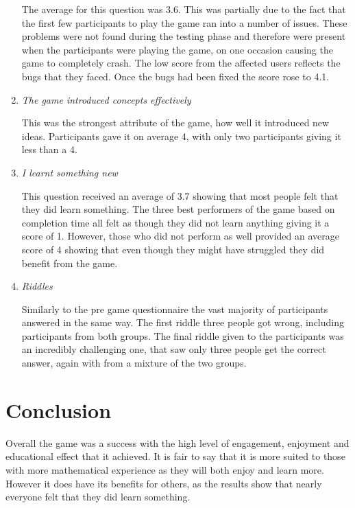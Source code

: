 \documentclass[12pt,a4paper]{report}
\begin{document}
\begin{enumerate}
	The average for this question was 3.6. This was partially due to the fact that the first few participants to play the game ran into a number of issues. These problems were not found during the testing phase and therefore were present when the participants were playing the game, on one occasion causing the game to completely crash. The low score from the affected users reflects the bugs that they faced. Once the bugs had been fixed the score rose to 4.1.
	
	\item  \textit {The game introduced concepts effectively}
	
	This was the strongest attribute of the game, how well it introduced new ideas. Participants gave it on average 4, with only two participants giving it less than a 4.
	
	\item  \textit {I learnt something new}
	
	This question received an average of 3.7 showing that most people felt that they did learn something. The three best performers of the game based on completion time all felt as though they did not learn anything giving it a score of 1. However, those who did not perform as well provided an average score of 4 showing that even though they might have struggled they did benefit from the game.
	
	\item  \textit {Riddles}
	
	Similarly to the pre game questionnaire the vast majority of participants answered in the same way. The first riddle three people got wrong, including participants from both groups. The final riddle given to the participants was an incredibly challenging one, that saw only three people get the correct answer, again with from a mixture of the two groups. 
	
\end{enumerate}

\chapter{Conclusion}

Overall the game was a success with the high level of engagement, enjoyment and educational effect that it achieved. It is fair to say that it is more suited to those with more mathematical experience as they will both enjoy and learn more. However it does have its benefits for others, as the results show that nearly everyone felt that they did learn something. 
\end{document}
